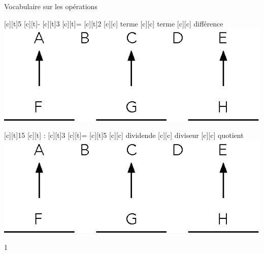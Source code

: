 \documentclass[a4paper,11pt]{report}
\begin{document}
\begin{resolu}{Vocabulaire sur les opérations}
{\bigskip

\begin{minipage}{0,45\linewidth}
\begin{center}
\begin{psfrags}
[c][t]{5}
[c][t]{-}
[c][t]{3}
[c][t]{=}
[c][t]{2}
[c][c]{{\color{blue} terme}}
[c][c]{{\color{blue} terme}}
[c][c]{{\color{blue} différence}}
\includegraphics[scale=1]{media/no-30/vocabulaire4op.eps}
\end{psfrags}
\end{center}
\end{minipage}
\hfill
\begin{minipage}{0,45\linewidth}
\begin{center}
\begin{psfrags}
[c][t]{15}
[c][t]{ : }
[c][t]{3}
[c][t]{=}
[c][t]{5}
[c][c]{{\color{blue} dividende}}
[c][c]{{\color{blue} diviseur}}
[c][c]{{\color{blue} quotient}}
\includegraphics[scale=1]{media/no-30/vocabulaire4op.eps}
\end{psfrags}
\end{center}
\end{minipage}
}{1}
\end{resolu}
\end{document}
